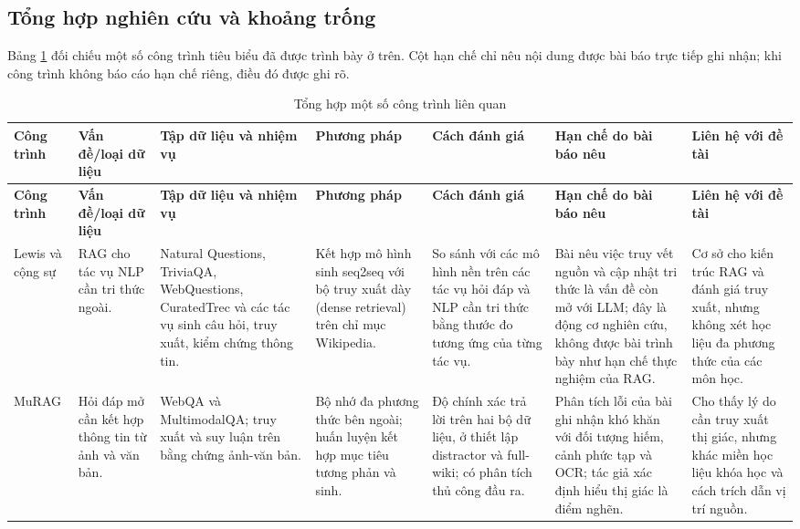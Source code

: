 \subsection{Tổng hợp nghiên cứu và khoảng trống}

Bảng \ref{tab:related-work-synthesis} đối chiếu một số công trình tiêu biểu đã được trình bày ở trên. Cột hạn chế chỉ nêu nội dung được bài báo trực tiếp ghi nhận; khi công trình không báo cáo hạn chế riêng, điều đó được ghi rõ.

\begin{landscape}
\scriptsize
\setlength{\tabcolsep}{3pt}
\renewcommand{\arraystretch}{1.15}
\setlength{\LTleft}{0pt}
\setlength{\LTright}{0pt}
\begin{longtable}{|p{2.2cm}|p{3.0cm}|p{3.2cm}|p{3.2cm}|p{2.8cm}|p{3.4cm}|p{3.0cm}|}
\caption{Tổng hợp một số công trình liên quan}\label{tab:related-work-synthesis}\\
\hline
\textbf{Công trình} & \textbf{Vấn đề/loại dữ liệu} & \textbf{Tập dữ liệu và nhiệm vụ} & \textbf{Phương pháp} & \textbf{Cách đánh giá} & \textbf{Hạn chế do bài báo nêu} & \textbf{Liên hệ với đề tài} \\
\hline
\endfirsthead
\hline
\textbf{Công trình} & \textbf{Vấn đề/loại dữ liệu} & \textbf{Tập dữ liệu và nhiệm vụ} & \textbf{Phương pháp} & \textbf{Cách đánh giá} & \textbf{Hạn chế do bài báo nêu} & \textbf{Liên hệ với đề tài} \\
\hline
\endhead
Lewis và cộng sự \cite{lewis2020rag} & RAG cho tác vụ NLP cần tri thức ngoài. & Natural Questions, TriviaQA, WebQuestions, CuratedTrec và các tác vụ sinh câu hỏi, truy xuất, kiểm chứng thông tin. & Kết hợp mô hình sinh seq2seq với bộ truy xuất dày (dense retrieval) trên chỉ mục Wikipedia. & So sánh với các mô hình nền trên các tác vụ hỏi đáp và NLP cần tri thức bằng thước đo tương ứng của từng tác vụ. & Bài nêu việc truy vết nguồn và cập nhật tri thức là vấn đề còn mở với LLM; đây là động cơ nghiên cứu, không được bài trình bày như hạn chế thực nghiệm của RAG. & Cơ sở cho kiến trúc RAG và đánh giá truy xuất, nhưng không xét học liệu đa phương thức của các môn học. \\
\hline
MuRAG \cite{chen2022murag} & Hỏi đáp mở cần kết hợp thông tin từ ảnh và văn bản. & WebQA và MultimodalQA; truy xuất và suy luận trên bằng chứng ảnh-văn bản. & Bộ nhớ đa phương thức bên ngoài; huấn luyện kết hợp mục tiêu tương phản và sinh. & Độ chính xác trả lời trên hai bộ dữ liệu, ở thiết lập distractor và full-wiki; có phân tích thủ công đầu ra. & Phân tích lỗi của bài ghi nhận khó khăn với đối tượng hiếm, cảnh phức tạp và OCR; tác giả xác định hiểu thị giác là điểm nghẽn. & Cho thấy lý do cần truy xuất thị giác, nhưng khác miền học liệu khóa học và cách trích dẫn vị trí nguồn. \\

\end{longtable}
\end{landscape}
